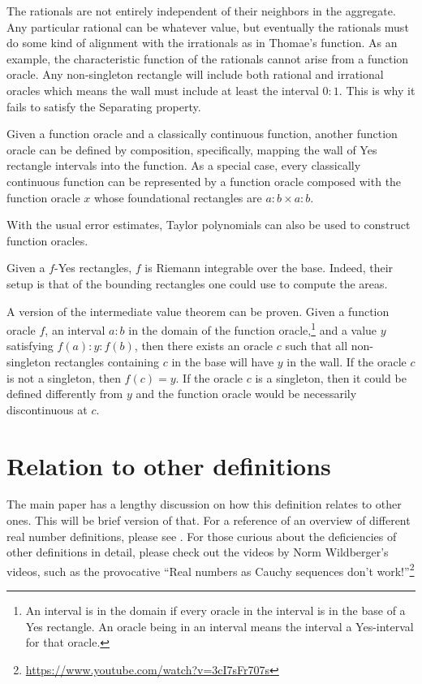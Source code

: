 \documentclass[12pt]{article}
\theoremstyle{remark}
\begin{document}
The rationals are not entirely independent of their neighbors in the aggregate. Any particular rational can be whatever value, but eventually the rationals must do some kind of alignment with the irrationals as in Thomae's function. As an example, the characteristic function of the rationals cannot arise from a function oracle. Any non-singleton rectangle will include both rational and irrational oracles which means the wall must include at least the interval $0:1$. This is why it fails to satisfy the Separating property. 

Given a function oracle and a classically continuous function, another function oracle can be defined by composition, specifically, mapping the wall of Yes rectangle intervals into the function. As a special case, every classically continuous function can be represented by a function oracle composed with the function oracle $x$ whose foundational rectangles are $a:b \times a:b$.

With the usual error estimates, Taylor polynomials can also be used to construct function oracles. 

Given a $f$-Yes rectangles, $f$ is Riemann integrable over the base. Indeed, their setup is that of the bounding rectangles one could use to compute the areas. 

A version of the intermediate value theorem can be proven. Given a function oracle $f$, an interval $a:b$ in the domain of the function oracle,\footnote{An interval is in the domain if every oracle in the interval is in the base of a Yes rectangle. An oracle being in an interval means the interval a Yes-interval for that oracle.} and a value $y$ satisfying $f(a):y:f(b)$, then there exists an oracle $c$ such that all non-singleton rectangles containing $c$ in the base will have $y$ in the wall. If the oracle $c$ is not a singleton, then $f(c) = y$. If the oracle $c$ is a singleton, then it could be defined differently from $y$ and the function oracle would be necessarily discontinuous at $c$. 


\section{Relation to other definitions}

The main paper has a lengthy discussion on how this definition relates to other ones. This will be brief version of that. For a reference of an overview of different real number definitions, please see \cite{ittay-2015}. For those curious about the deficiencies of other definitions in detail, please check out the videos by Norm Wildberger's videos, such as the provocative ``Real numbers as Cauchy sequences don't work!''\footnote{\url{https://www.youtube.com/watch?v=3cI7sFr707s}} 
\end{document}
